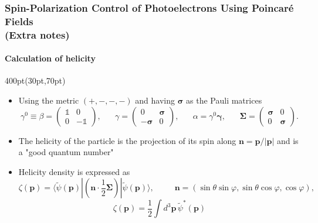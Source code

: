 \begin{frame}
\frametitle{Spin-Polarization Control of Photoelectrons
Using Poincar\'e Fields \\
\small (Extra notes)}
\framesubtitle{Calculation of helicity}


\footnotesize
\begin{textblock*}{400pt}(30pt,70pt)
\begin{itemize}
\item Using the metric $\left(+,-,-,-\right)$ and having $\boldsymbol{\sigma}$
as the Pauli matrices
\begin{equation}
\gamma^0 \equiv \beta =
\left(
\begin{matrix}
\mathds{1}  & 0          \\
0           & -\mathds{1} 
\end{matrix}\right), \hspace{20pt}
\gamma =
\left(
\begin{matrix}
0                              & \boldsymbol{\sigma}          \\
-\boldsymbol{\sigma}           & 0
\end{matrix}\right), \hspace{20pt}
\alpha = \gamma^0\boldsymbol{\gamma}, \hspace{20pt}
\boldsymbol{\Sigma} =
\left(
\begin{matrix}
\boldsymbol{\sigma}            &        0                    \\
0                              &        \boldsymbol{\sigma}        
\end{matrix}\right).
\end{equation}
\item The helicity of the particle is the projection of its spin along 
$\boldsymbol{n} = \boldsymbol{p}/|\boldsymbol{p}|$ and is 
a "good quantum number"
\item Helicity density is expressed as
\begin{equation}
\zeta(\boldsymbol{p}) = \langle \widetilde{\psi}(\boldsymbol{p}) |
\left( \boldsymbol{n}\cdot\frac{1}{2}\boldsymbol{\Sigma}\right)
|\widetilde{\psi}(\boldsymbol{p})\rangle, \hspace{30pt}
\boldsymbol{n} =
\left(\sin\theta\sin\varphi,\sin\theta\cos\varphi,\cos\varphi\right),
\hspace{20pt}
\end{equation}
\begin{equation}
\zeta(\boldsymbol{p}) = \frac{1}{2}\int d^3\boldsymbol{p}\,
\widetilde{\psi}^{*}(\boldsymbol{p})

\end{equation}
\end{itemize}
\end{textblock*}
\end{frame}

